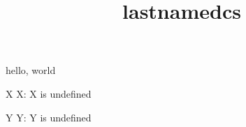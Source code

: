 \documentclass{amsart}
\title{lastnamedcs}
\begin{document}
\maketitle

hello, world

\def\T#1{%
    \ifcsname #1\endcsname
        #1: \lastnamedcs
    \else
        #1 is undefined
    \fi
}

\def\X{XXX}

\T{X}

\T{Y}
\end{document}
